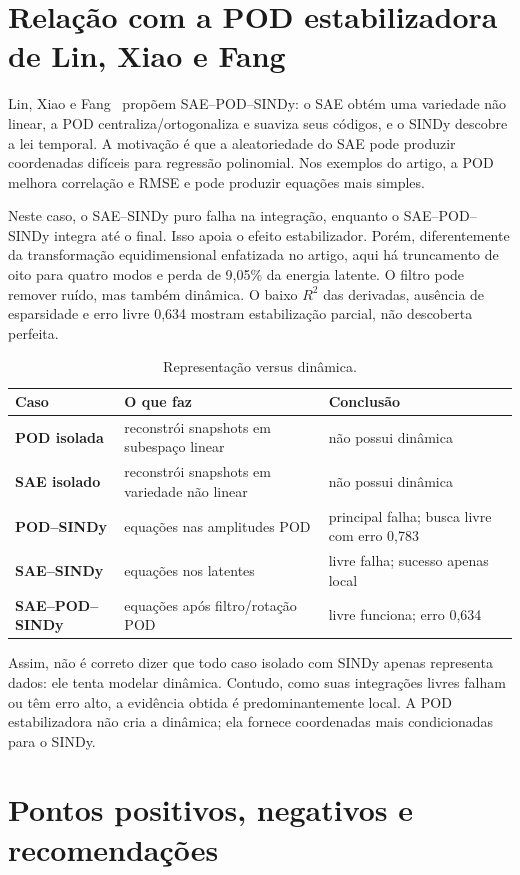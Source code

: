 \documentclass[12pt,a4paper]{article}
\begin{document}
\section{Relação com a POD estabilizadora de Lin, Xiao e Fang}
Lin, Xiao e Fang~\cite{lin2024} propõem SAE--POD--SINDy: o SAE obtém uma variedade não linear, a POD centraliza/ortogonaliza e suaviza seus códigos, e o SINDy descobre a lei temporal. A motivação é que a aleatoriedade do SAE pode produzir coordenadas difíceis para regressão polinomial. Nos exemplos do artigo, a POD melhora correlação e RMSE e pode produzir equações mais simples.

Neste caso, o SAE--SINDy puro falha na integração, enquanto o SAE--POD--SINDy integra até o final. Isso apoia o efeito estabilizador. Porém, diferentemente da transformação equidimensional enfatizada no artigo, aqui há truncamento de oito para quatro modos e perda de 9,05\% da energia latente. O filtro pode remover ruído, mas também dinâmica. O baixo $R^2$ das derivadas, ausência de esparsidade e erro livre 0,634 mostram estabilização parcial, não descoberta perfeita.

\begin{table}[H]\centering\caption{Representação versus dinâmica.}\label{tab:rep}
\begin{tabularx}{\textwidth}{>{\bfseries}l X X}\toprule Caso&O que faz&Conclusão\\\midrule
POD isolada&reconstrói snapshots em subespaço linear&não possui dinâmica\\
SAE isolado&reconstrói snapshots em variedade não linear&não possui dinâmica\\
POD--SINDy&equações nas amplitudes POD&principal falha; busca livre com erro 0,783\\
SAE--SINDy&equações nos latentes&livre falha; sucesso apenas local\\
SAE--POD--SINDy&equações após filtro/rotação POD&livre funciona; erro 0,634\\
\bottomrule\end{tabularx}\end{table}

Assim, não é correto dizer que todo caso isolado com SINDy apenas representa dados: ele tenta modelar dinâmica. Contudo, como suas integrações livres falham ou têm erro alto, a evidência obtida é predominantemente local. A POD estabilizadora não cria a dinâmica; ela fornece coordenadas mais condicionadas para o SINDy.

\section{Pontos positivos, negativos e recomendações}
\end{document}
